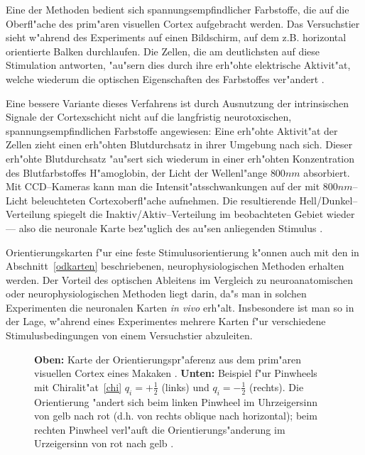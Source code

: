 Eine der Methoden bedient sich spannungsempfindlicher Farbstoffe, die auf
die Oberfl"ache des prim"aren visuellen Cortex aufgebracht werden. Das
Versuchstier sieht w"ahrend des Experiments auf einen Bildschirm, auf dem
z.B. horizontal orientierte Balken durchlaufen. Die Zellen, die am
deutlichsten auf diese Stimulation antworten, "au"sern dies durch ihre
erh"ohte elektrische Aktivit"at, welche wiederum die optischen
Eigenschaften des Farbstoffes ver"andert \cite{blasdel:1986,blasdel:1992a}.

Eine bessere Variante dieses Verfahrens ist durch Ausnutzung der
intrinsischen Signale der Cortexschicht nicht auf die langfristig
neurotoxischen, spannungsempfindlichen Farbstoffe angewiesen: Eine erh"ohte
Aktivit"at der Zellen zieht einen erh"ohten Blutdurchsatz in ihrer Umgebung
nach sich. Dieser erh"ohte Blutdurchsatz "au"sert sich wiederum in einer
erh"ohten Konzentration des Blutfarbstoffes H"amoglobin, der Licht der
Wellenl"ange $800nm$ absorbiert. Mit CCD--Kameras kann man die
Intensit"atsschwankungen auf der mit $800nm$--Licht beleuchteten
Cortexoberfl"ache aufnehmen. Die resultierende Hell/Dunkel--Verteilung
spiegelt die Inaktiv/Aktiv--Verteilung im beobachteten Gebiet wieder ---
also die neuronale Karte bez"uglich des au"sen anliegenden Stimulus
\cite{lieke:1989,grinvald:1991}.

Orientierungskarten f"ur eine feste Stimulusorientierung k"onnen auch mit
den in Abschnitt~\ref{odkarten} beschriebenen, neurophysiologischen
Methoden erhalten werden.  Der Vorteil des optischen Ableitens im Vergleich
zu neuroanatomischen oder neurophysiologischen Methoden liegt darin, da"s
man in solchen Experimenten die neuronalen Karten \emph{in vivo}
erh"alt. Insbesondere ist man so in der Lage, w"ahrend eines Experimentes
mehrere Karten f"ur verschiedene Stimulusbedingungen von einem Versuchstier
abzuleiten.

\begin{figure}[t]
\begin{center}
\begin{minipage}{10cm}
\end{minipage}
\vskip0.5cm
\begin{minipage}[b]{4cm}
\end{minipage}
\end{center}
\caption{\textbf{Oben:} Karte der Orientierungspr"aferenz aus dem prim"aren
visuellen Cortex eines Makaken \protect{}.
\textbf{Unten:} Beispiel f"ur Pinwheels mit Chiralit"at~\eqref{chi}
$q_i=+\frac{1}{2}$ (links) und $q_i=-\frac{1}{2}$ (rechts). Die
Orientierung "andert sich beim linken Pinwheel im Uhrzeigersinn von gelb
nach rot (d.h. von rechts oblique nach horizontal); beim rechten Pinwheel
verl"auft die Orientierungs"anderung im Urzeigersinn von rot nach gelb
\protect{}.}
\label{opblasdel}
\end{figure}

